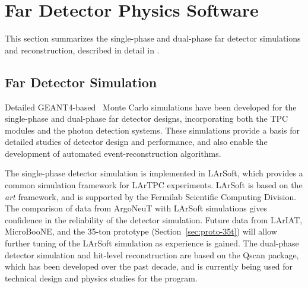 \section{Far Detector Physics Software}
\label{sec:detectors-sc-physics-software}

This section summarizes %
the single-phase and dual-phase far detector
simulations and reconstruction, described in detail in \anxreco. %

%

\subsection{Far Detector Simulation}
\label{sec:detectors-sc-physics-software-simulation-fd}

Detailed GEANT4-based~\cite{GEANT4:NIM,GEANT4} Monte Carlo simulations
have been developed for the single-phase and dual-phase far detector
designs, incorporating both the TPC modules and the photon detection
systems. These simulations provide a basis for detailed studies of
detector design and performance, and also enable the development of
automated event-reconstruction algorithms.

The single-phase detector simulation is implemented in
LArSoft\cite{Church:2013hea}, which provides a common simulation
framework for LArTPC experiments.  LArSoft is based on the \textit{art}
framework\cite{Green:2012gv}, and is supported by the Fermilab
Scientific Computing Division.  The comparison of data from
ArgoNeuT\cite{Anderson:2012vc,Anderson:2012mra} with LArSoft
simulations gives confidence in the reliability of the detector
simulation.  Future data from
LArIAT\cite{Adamson:2013/02/28tla,Cavanna:2014iqa},
MicroBooNE\cite{Chen:2007ae,Jones:2011ci,microboonecdr}, and the
35-ton prototype (Section~\ref{sec:proto-35t}) will allow further tuning
of the LArSoft simulation as experience is gained.  The dual-phase
detector simulation and hit-level reconstruction are based on the
Qscan\cite{lussi:thesis} package, which has been developed over the
past decade, and is currently being used for technical design and
physics studies for the \cerndualproto{} program.

